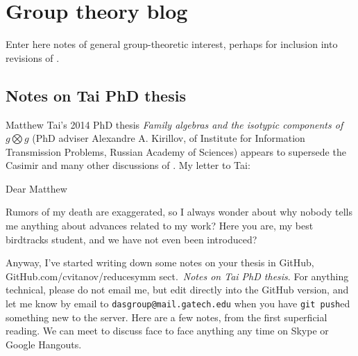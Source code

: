 
\chapter{Group theory blog}
\label{c-groupThe}


Enter here notes of general group-theoretic interest, perhaps
for inclusion into revisions of \wwwgt.

\section{Notes on Tai PhD thesis}
\label{s-groupTheBlog}

Matthew Tai's 2014 PhD thesis
{\em Family algebras and the isotypic components of $g \bigotimes g$}
(PhD adviser
{Alexandre A. Kirillov}, of
 Institute for Information Transmission Problems, Russian Academy of Sciences)
appears to supersede the Casimir and many other discussions of {\wwwgt}.
My letter to Tai:

Dear Matthew

Rumors of my death are exaggerated, so I always wonder about why nobody
tells me anything about advances related to my work? Here you are, my
best birdtracks student, and we have not even been introduced?

Anyway, I've started writing down some notes on your thesis in GitHub,
\\
{GitHub.com/cvitanov/reducesymm}
sect.~{\em Notes on Tai PhD thesis}. For anything technical, please do
not email me, but edit directly into the GitHub version, and let me know
by email to \texttt{dasgroup@mail.gatech.edu} when you have \texttt{git
push}ed something new to the server. Here are a few notes, from the first
superficial reading. We can meet to discuss face to face anything any
time on Skype or Google Hangouts.

